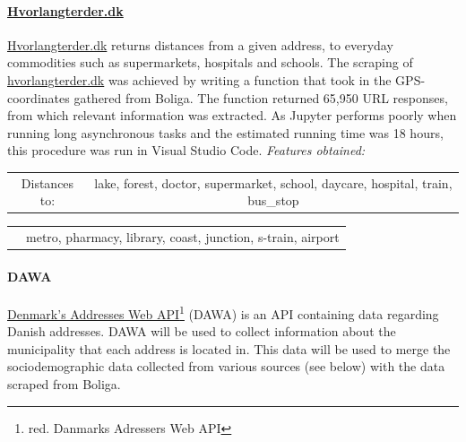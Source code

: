\documentclass[12pt,a4paper]{article}
\begin{document}
\paragraph{\href{https://www.hvorlangterder.dk}{Hvorlangterder.dk}\newline}
\href{https://www.hvorlangterder.dk}{Hvorlangterder.dk} returns distances from a given address, to everyday commodities such as supermarkets, hospitals and schools.   
The scraping of \href{https://www.hvorlangterder.dk}{hvorlangterder.dk} was achieved by writing a function that took in the GPS-coordinates gathered from Boliga. The function returned 65,950 URL responses, from which relevant information was extracted.\newline
As Jupyter performs poorly when running long asynchronous tasks and the estimated running time was 18 hours, this procedure was run in Visual Studio Code.
 \vspace*{10px} \newline
\textit{Features obtained:}\newline
\begin{tabular}{c c}
Distances to: & lake, forest, doctor, supermarket,	school, daycare, hospital, train, bus\_stop \\	
\end{tabular}\newline 
\begin{tabular}{c c}
\qquad \qquad \qquad \qquad & metro, pharmacy, library, coast, junction, s-train, airport \\	
\end{tabular}

              

\paragraph{DAWA\newline}
\href{https://dawa.aws.dk/}{Denmark's Addresses Web API}\footnote{red. Danmarks Adressers Web API} (DAWA) is an API containing data regarding Danish addresses. DAWA will be used to collect information about the municipality that each address is located in. This data will be used to merge the sociodemographic data collected from various sources (see below) with the data scraped from Boliga.
\end{document}
